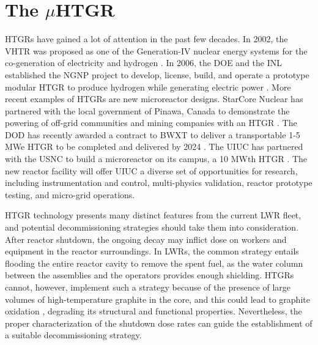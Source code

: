\section{The $\mu$HTGR}
\label{sec:micro}


\Glspl*{HTGR} have gained a lot of attention in the past few decades.
In 2002, the \gls*{VHTR} was proposed as one of the Generation-IV nuclear energy systems for the co-generation of electricity and hydrogen \cite{doe_vhtr_2002}.
In 2006, the \gls*{DOE} and the \gls*{INL} established the \gls*{NGNP} project to develop, license, build, and operate a prototype modular \gls*{HTGR} to produce hydrogen while generating electric power \cite{ngnp}.
More recent examples of HTGRs are new microreactor designs.
StarCore Nuclear has partnered with the local government of Pinawa, Canada to demonstrate the powering of off-grid communities and mining companies with an HTGR \cite{starcore}.
The \gls*{DOD} has recently awarded a contract to BWXT to deliver a transportable 1-5 MWe HTGR to be completed and delivered by 2024 \cite{bwxt}.
The \gls*{UIUC} has partnered with the \gls*{USNC} to build a microreactor on its campus, a 10 MWth \gls*{HTGR} \cite{uiuc-mmr2}.
The new reactor facility will offer UIUC a diverse set of opportunities for research, including instrumentation and control, multi-physics validation, reactor prototype testing, and micro-grid operations.

HTGR technology presents many distinct features from the current \gls*{LWR} fleet, and potential decommissioning strategies should take them into consideration.
After reactor shutdown, the ongoing decay may inflict dose on workers and equipment in the reactor surroundings.
In \glspl*{LWR}, the common strategy entails flooding the entire reactor cavity to remove the spent fuel, as the water column between the assemblies and the operators provides enough shielding.
HTGRs cannot, however, implement such a strategy because of the presence of large volumes of high-temperature graphite in the core, and this could lead to graphite oxidation \cite{oxidation}, degrading its structural and functional properties.
Nevertheless, the proper characterization of the shutdown dose rates can guide the establishment of a suitable decommissioning strategy.


